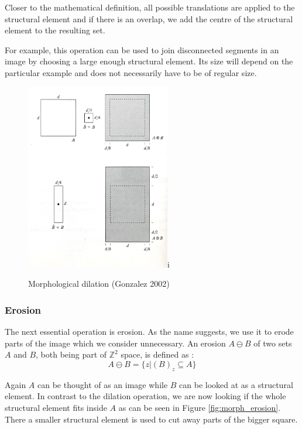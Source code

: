 \documentclass[
  digital,     %
  oneside,     %
  nosansbold,  %
  nocolorbold, %
  lof,         %
  lot,         %
]{fithesis4}
\newcommand*{\Z}{\ensuremath{\mathbb{Z}}}
\begin{document}
Closer to the mathematical definition, all possible translations are applied to
the structural element and if there is an overlap, we add the centre of the
structural element to the resulting set.

For example, this operation can be used to join disconnected segments in an
image by choosing a large enough structural element. Its size will depend on the
particular example and does not necessarily have to be of regular size.

\begin{figure}
    \begin{center}
        \includegraphics[width=6.3cm]{resources/morph_dilation.jpg}i
    \end{center}
    \caption{Morphological dilation (Gonzalez 2002)} %
    \label{fig:morph_dilation}
\end{figure}

\subsubsection{Erosion}

The next essential operation is erosion. As the name suggests, we use it to
erode parts of the image which we consider unnecessary. An erosion $A \ominus B$
of two sets $A$ and $B$, both being part of $\Z^2$ space, is defined as
\cite{gonzalez2002}: $$A \ominus B = \{z | (B)_z \subseteq A\}$$

Again $A$ can be thought of as an image while $B$ can be looked at as a
structural element. In contrast to the dilation operation, we are now looking if
the whole structural element fits inside $A$ as can be seen in Figure
\ref{fig:morph_erosion}. There a smaller structural element is used to cut away
parts of the bigger square.
\end{document}
